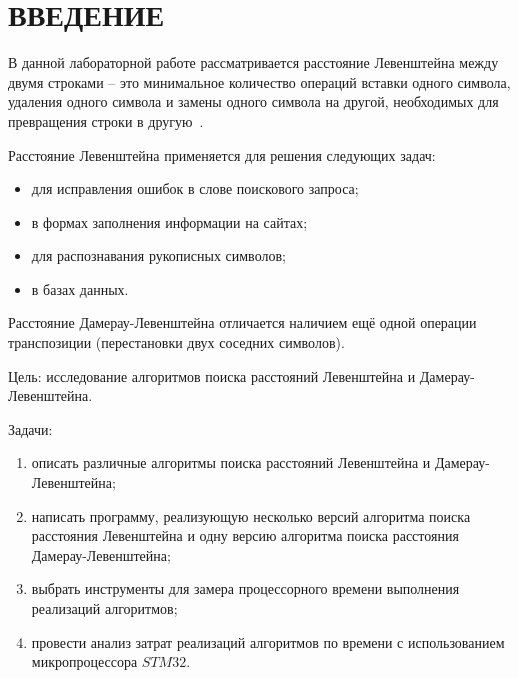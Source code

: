 \chapter*{ВВЕДЕНИЕ}

В данной лабораторной работе рассматривается расстояние Левенштейна между двумя строками -- это минимальное количество операций вставки одного символа, удаления одного символа и замены одного символа на другой, необходимых для превращения строки в другую~\cite{levenshtein}. 

Расстояние Левенштейна применяется для решения следующих задач:
\begin{itemize}
	\item для исправления ошибок в слове поискового запроса;
	\item в формах заполнения информации на сайтах;
	\item для распознавания рукописных символов;
	\item в базах данных.
\end{itemize}

Расстояние Дамерау-Левенштейна отличается наличием ещё одной операции транспозиции (перестановки двух соседних символов).

Цель: исследование алгоритмов поиска расстояний Левенштейна и Даме\-рау-Левенштейна.

Задачи:
\begin{enumerate}[label={\arabic*)}]
	\item описать различные алгоритмы поиска расстояний Левенштейна и Даме\-рау-Левенштейна;
	\item написать программу, реализующую несколько версий алгоритма поиска расстояния Левенштейна и одну версию алгоритма поиска расстояния Дамерау-Левенштейна;
	\item выбрать инструменты для замера процессорного времени выполнения реализаций алгоритмов;
	\item провести анализ затрат реализаций алгоритмов по времени с использованием микропроцессора $STM32$.
\end{enumerate}